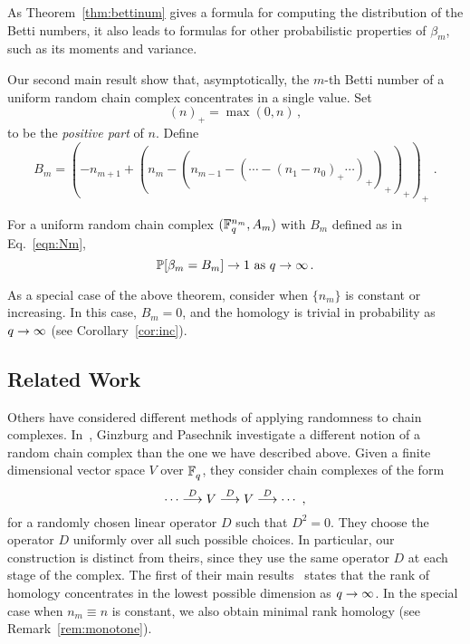 As Theorem~\ref{thm:bettinum} gives a formula for
computing the distribution of the Betti numbers, it also leads to formulas for
other probabilistic properties of $\beta_m$, such as its moments and variance.

Our second main result show that, asymptotically, the $m$-th Betti number of a uniform random chain complex concentrates in a single value. Set
\begin{equation*}
  (n)_+ = \max(0,n) \, , %
\end{equation*}
to be the {\em positive part} of $n$.
Define
\begin{equation}
  B_m = (-n_{m+1} + (n_m - (n_{m-1} - (\cdots - (n_1 - n_0)_+ \cdots)_+ )_+
  )_+)_+ \, \, .
  \label{eqn:Nm}
\end{equation}

\begin{bigthm}
  \label{thm:qtoinfty}
  For a uniform random chain complex $(\mathbb{F}_q^{n_m},A_m)$ with $B_m$ defined as in Eq.~\eqref{eqn:Nm},
  \[
    \mathbb{P}[\beta_m = B_m] \rightarrow 1 
    \mbox{ as } q \rightarrow \infty  \, .
  \]
\end{bigthm}


\begin{remark}
  \label{rem:monotone}
  As a special case of the above theorem, consider when $\{n_m\}$
  is constant or increasing. In this case, 
  $B_m = 0$, and the homology is trivial in probability as $q \rightarrow \infty$ 
  (see Corollary~\ref{cor:inc}). 
\end{remark}

\subsection*{Related Work} Others have considered different methods of applying
randomness to chain complexes. In~\cite{ginzburg2017random}, Ginzburg and
Pasechnik investigate a different notion of a random chain complex than the one
we have described above.  Given a finite dimensional vector space $V$ over
$\mathbb{F}_q^{}$, they consider chain complexes of the form \[ \cdots
\stackrel{D}{\longrightarrow} V \stackrel{D}{\longrightarrow} V \stackrel{D}{\longrightarrow} \cdots \, \, , \]
for a randomly chosen linear operator $D$ such that $D^2 = 0$. They choose the
operator $D$ uniformly over all such possible choices. In particular, our
construction is distinct from theirs, since they use the same operator $D$ at
each stage of the complex.
The first of their main results~\cite[Thm 2.1]{ginzburg2017random} states that
the rank of homology concentrates in the lowest possible dimension as $q \rightarrow \infty$.  
In the special case when $n_m \equiv n$ is constant, we also obtain minimal rank
homology (see Remark~\ref{rem:monotone}).


